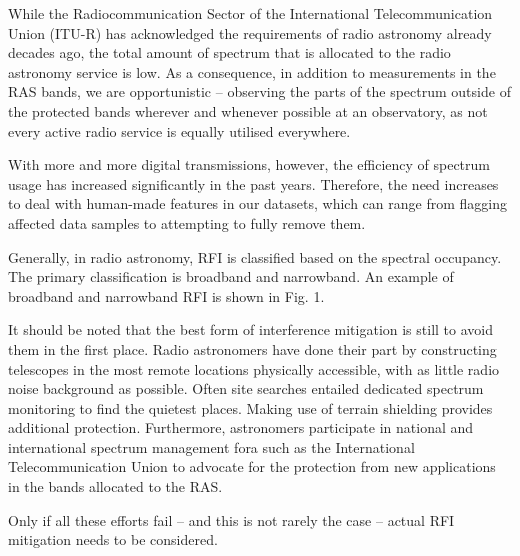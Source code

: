 While the Radiocommunication Sector of the International Telecommunication Union (ITU-R) has acknowledged the requirements of radio astronomy already decades ago, the total amount of spectrum that is allocated to the radio astronomy service is low. As a consequence, in addition to measurements in the RAS bands, we are opportunistic -- observing the parts of the spectrum outside of the protected bands wherever and whenever possible at an observatory, as not every active radio service is equally utilised everywhere. 

With more and more digital transmissions, however, the efficiency of spectrum usage has increased significantly in the past years. Therefore, the need increases to deal with human-made features in our datasets, which can range from flagging affected data samples to attempting to fully remove them.

Generally, in radio astronomy, RFI is classified based on the spectral occupancy. The primary classification is broadband and narrowband. An example of broadband and narrowband RFI is shown in Fig. 1.

It should be noted that the best form of interference mitigation is still to avoid them in the first place. Radio astronomers have done their part by constructing telescopes in the most remote locations physically accessible, with as little radio noise background as possible. Often site searches entailed dedicated spectrum monitoring to find the quietest places. Making use of terrain shielding provides additional protection. Furthermore, astronomers participate in national and international spectrum management fora such as the International Telecommunication Union to advocate for the protection from new applications in the bands allocated to the RAS.

Only if all these efforts fail -- and this is not rarely the case -- actual RFI mitigation needs to be considered.


